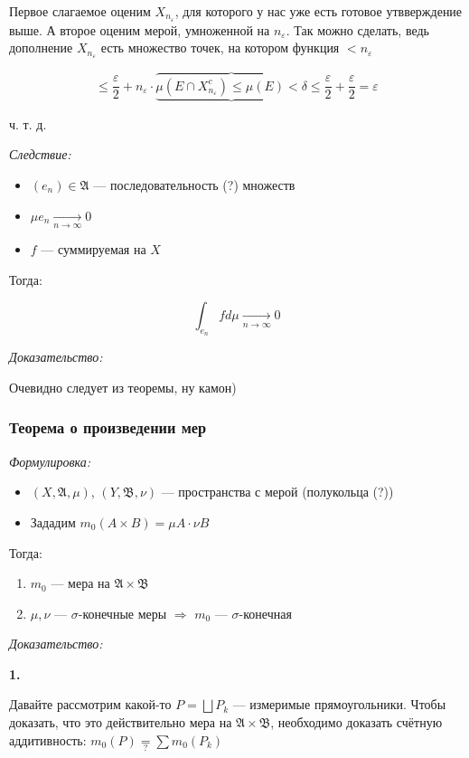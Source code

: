 \documentclass{article}
\def\goesto#1{\underset{#1}{\longrightarrow}}
\def\toinf#1{\goesto{#1 \rightarrow \infty}}
\def\ntoinf{\toinf{n}}
\begin{document}
Первое слагаемое оценим $X_{n_{\varepsilon}}$, для которого у нас уже есть готовое утвверждение выше. А второе оценим мерой, умноженной на $n_\varepsilon$. Так можно сделать, ведь дополнение $X_{n_\varepsilon}$ есть множество точек, на котором функция $< n_{\varepsilon}$

\[\le \frac{\varepsilon}{2} + n_{\varepsilon} \cdot \overbrace{\underbrace{\mu \left( E \cap X^c_{n_{\varepsilon}}\right) \le \mu\left( E \right) < \delta}} \le \frac{\varepsilon}{2} + \frac{\varepsilon}{2} = \varepsilon\]

ч. т. д. 

\textit{Следствие:}
\begin{itemize}
    \item $(e_n) \in \mathfrak{A}$ --- последовательность (?) множеств\
    \item $\mu e_n \ntoinf 0$
    \item $f$ --- суммируемая на $X$
\end{itemize}

Тогда:

\[\int_{e_n} f d \mu \ntoinf 0\]

\textit{Доказательство:}


Очевидно следует из теоремы, ну камон)

\subsubsection{Теорема о произведении мер}
\textit{Формулировка:}

\begin{itemize}
    \item $(X, \mathfrak{A}, \mu)$, $(Y, \mathfrak{B}, \nu)$ --- пространства с мерой (полукольца (?))
    \item Зададим $m_0(A \times B) = \mu A \cdot \nu B$
\end{itemize}

Тогда:

\begin{enumerate}
    \item $m_0$ --- мера на $\mathfrak{A} \times \mathfrak{B}$
    \item $\mu, \nu$ --- $\sigma$-конечные меры $\Longrightarrow$ $m_0$ --- $\sigma$-конечная
\end{enumerate}

\textit{Доказательство:}

\textbf{1.}

Давайте рассмотрим какой-то $P = \bigsqcup P_k$ --- измеримые прямоугольники. Чтобы доказать, что это действительно мера на $\mathfrak{A} \times \mathfrak{B}$, необходимо доказать счётную аддитивность: $m_0(P) \underset{?}{=} \sum m_0(P_k)$
\end{document}
